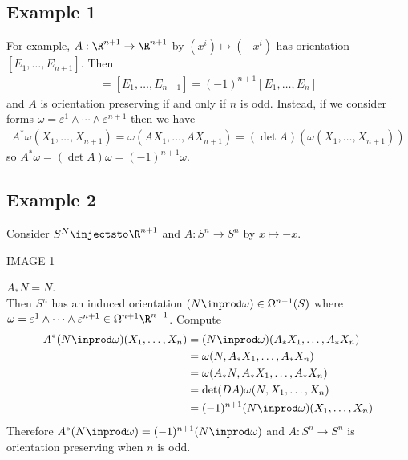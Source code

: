 \documentclass[11pt]{article}
\begin{document}
\subsection*{Example 1}
\label{sec:org50a126e}
For example, \(A:\R^{n+1}\to\R^{n+1}\) by \((x^{i})\mapsto(-x^{i})\) has orientation \([E_{1},\ldots,E_{n+1}]\). Then\\
\begin{align*}
  [AE_{1},\ldots, AE_{n+1}]
  =[E_{1},\ldots,E_{n+1}]
  =(-1)^{n+1}[E_{1},\ldots,E_{n}]
\end{align*}
and \(A\) is orientation preserving if and only if \(n\) is odd. Instead, if we consider forms \(\omega=\varepsilon^{1}\wedge\cdots\wedge\varepsilon^{n+1}\) then we have\\
\begin{align*}
  A^{*}\omega(X_{1},\ldots,X_{n+1})
  =\omega(AX_{1},\ldots,AX_{n+1})
  =(\det A)(\omega(X_{1},\ldots,X_{n+1}))
\end{align*}
so \(A^{*}\omega=(\det A)\omega=(-1)^{n+1}\omega\).\\
\subsection*{Example 2}
\label{sec:orge8844d9}
Consider \(S^{N}\injectsto\R^{n+1}\) and \(A:S^{n}\to S^{n}\) by \(x\mapsto -x\).\\
\begin{center}
IMAGE 1\\
\end{center}
\(A_{*}N=N\).\\
Then \(S^{n}\) has an induced orientation \((N\inprod\omega)\in\Omega^{n-1}(S)\) where \(\omega=\varepsilon^{1}\wedge\cdots\wedge\varepsilon^{n+1}\in\Omega^{n+1}\R^{n+1}\). Compute\\
\begin{align*}
  A^{*}(N\inprod\omega)(X_{1},\ldots,X_{n})
  &=(N\inprod\omega)(A_{*}X_{1},\ldots,A_{*}X_{n}) \\
  &=\omega(N,A_{*}X_{1},\ldots,A_{*}X_{n}) \\
  &=\omega(A_{*}N,A_{*}X_{1},\ldots,A_{*}X_{n}) \\
  &=\det(DA)\omega(N,X_{1},\ldots,X_{n}) \\
  &=(-1)^{n+1}(N\inprod\omega)(X_{1},\ldots, X_{n})
\end{align*}
Therefore \(A^{*}(N\inprod\omega)=(-1)^{n+1}(N\inprod\omega)\) and \(A:S^{n}\to S^{n}\) is orientation preserving when \(n\) is odd.\\
\end{document}
